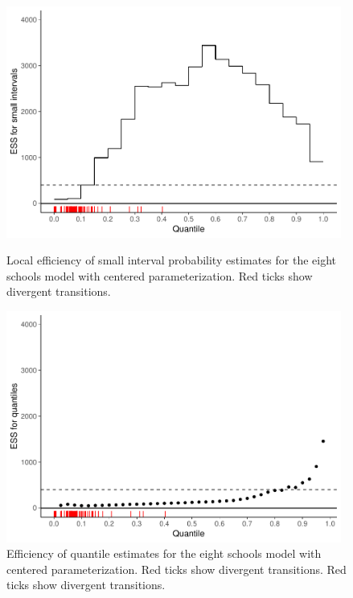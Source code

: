 \documentclass[american,]{article}
\theoremstyle{definition}
\begin{document}
\begin{figure}[tp]
  \centering
  \begin{minipage}{0.48\textwidth}
  \includegraphics[width=0.98\textwidth]{graphics/local-ess-fit-cp-1.pdf}
  \caption{Local efficiency of small interval probability estimates for the eight  
  schools model with centered parameterization. Red ticks show divergent transitions.}
  \label{fig:local-ess-fit-cp-1}
\end{minipage}
\hfill
  \begin{minipage}{0.48\textwidth}
  \includegraphics[width=0.98\textwidth]{graphics/quantile-ess-fit-cp-1.pdf}
  \caption{Efficiency of quantile estimates for the eight schools model with 
  centered parameterization. Red ticks show divergent transitions. Red ticks 
  show divergent transitions.}
  \label{fig:quantile-ess-fit-cp-1}
 \end{minipage}
\end{figure}
\end{document}
